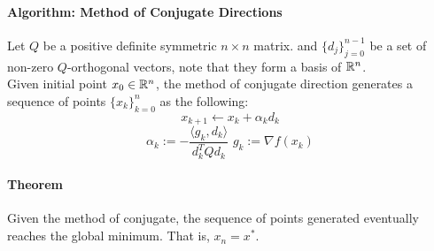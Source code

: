 \documentclass[11pt]{article}
\begin{document}
\paragraph{Algorithm: Method of Conjugate Directions}
Let $Q$ be a positive definite symmetric $n \times n$ matrix. and $\{d_j\}_{j=0}^{n-1}$ be a set of non-zero $Q$-orthogonal vectors, note that they form a basis of $\mathbb{R}^n$. \\
Given initial point $x_0 \in \mathbb{R}^n$, the method of conjugate direction generates a sequence of points $\{x_k\}_{k=0}^n$ as the following:
$$x_{k+1} \leftarrow x_k + \alpha_k d_k$$
$$\alpha_k := -\frac{\langle g_k, d_k\rangle}{d_k^TQd_k} \,\, g_k := \nabla f(x_k)$$
\paragraph{Theorem} Given the method of conjugate, the sequence of points generated eventually reaches the global minimum. That is, $x_{n} = x^*$. \\
\end{document}
